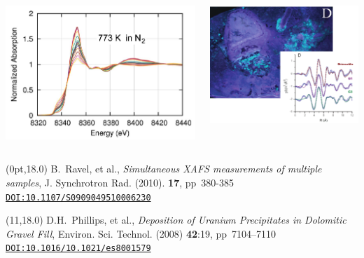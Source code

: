 \documentclass[10pt, xcolor=x11names, compress]{beamer}
\begin{document}
\begin{frame}
  \begin{columns}[T]
    \begin{column}{0.5\linewidth}
      \includegraphics[width=\linewidth]{images/timeseq.png}
    \end{column}
    \begin{column}{0.5\linewidth}
      \includegraphics[width=\linewidth]{images/mapexafs.png}
    \end{column}
  \end{columns}
  \begin{textblock*}{0.4\linewidth}(0pt,18.0\TPVertModule)%
    \tiny%
    B.\ Ravel, et al., \textit{Simultaneous XAFS measurements of
      multiple samples}, J. Synchrotron Rad. (2010). \textbf{17}, pp\
    380-385 \href{http://dx.doi.org/10.1107/S0909049510006230}
    {\color{Blue4}\texttt{DOI:10.1107/S0909049510006230}}
  \end{textblock*}
  \begin{textblock*}{0.4\linewidth}(11\TPHorizModule,18.0\TPVertModule)%
    \tiny%
    D.H.\ Phillips, et al., \textit{Deposition of Uranium Precipitates
      in Dolomitic Gravel Fill}, Environ. Sci. Technol. (2008)
    \textbf{42}:19, pp\ 7104–7110
    \href{http://dx.doi.org/10.1021/es8001579}
    {\color{Blue4}\texttt{DOI:10.1016/10.1021/es8001579}}
  \end{textblock*}
\end{frame}
\end{document}
